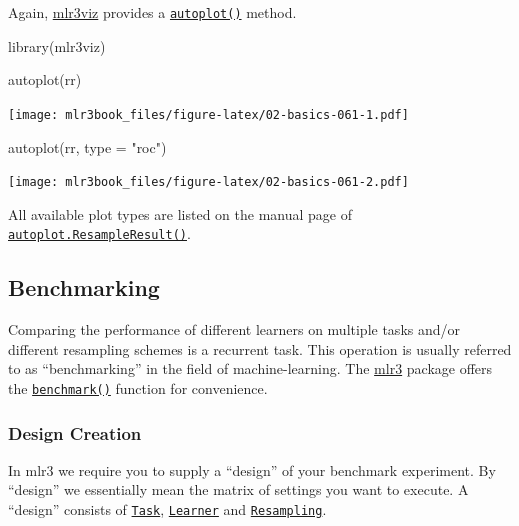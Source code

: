 \documentclass[]{article}
\newenvironment{Shaded}{}{}
\newcommand{\DataTypeTok}[1]{#1}
\newcommand{\KeywordTok}[1]{\textcolor[rgb]{0.00,0.00,1.00}{#1}}
\newcommand{\NormalTok}[1]{#1}
\newcommand{\StringTok}[1]{\textcolor[rgb]{0.00,0.50,0.50}{#1}}
\renewenvironment{Shaded} {\begin{snugshade}\small} {\end{snugshade}}
\begin{document}
Again, \href{https://mlr3viz.mlr-org.com}{mlr3viz} provides a \href{https://www.rdocumentation.org/packages/ggplot2/topics/autoplot}{\texttt{autoplot()}} method.

\begin{Shaded}
\begin{Highlighting}[]
\KeywordTok{library}\NormalTok{(mlr3viz)}

\KeywordTok{autoplot}\NormalTok{(rr)}
\end{Highlighting}
\end{Shaded}

\texttt{[image: mlr3book\_files/figure-latex/02-basics-061-1.pdf]}

\begin{Shaded}
\begin{Highlighting}[]
\KeywordTok{autoplot}\NormalTok{(rr, }\DataTypeTok{type =} \StringTok{"roc"}\NormalTok{)}
\end{Highlighting}
\end{Shaded}

\texttt{[image: mlr3book\_files/figure-latex/02-basics-061-2.pdf]}

All available plot types are listed on the manual page of \href{https://mlr3viz.mlr-org.com/reference/autoplot.ResampleResult.html}{\texttt{autoplot.ResampleResult()}}.

\hypertarget{benchmarking}{%
\subsection{Benchmarking}\label{benchmarking}}

Comparing the performance of different learners on multiple tasks and/or different resampling schemes is a recurrent task.
This operation is usually referred to as ``benchmarking'' in the field of machine-learning.
The \href{https://mlr3.mlr-org.com}{mlr3} package offers the \href{https://mlr3.mlr-org.com/reference/benchmark.html}{\texttt{benchmark()}} function for convenience.

\hypertarget{bm-design}{%
\subsubsection{Design Creation}\label{bm-design}}

In mlr3 we require you to supply a ``design'' of your benchmark experiment.
By ``design'' we essentially mean the matrix of settings you want to execute.
A ``design'' consists of \href{https://mlr3.mlr-org.com/reference/Task.html}{\texttt{Task}}, \href{https://mlr3.mlr-org.com/reference/Learner.html}{\texttt{Learner}} and \href{https://mlr3.mlr-org.com/reference/Resampling.html}{\texttt{Resampling}}.
\end{document}
